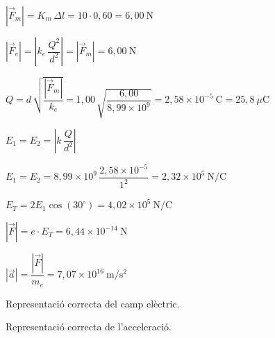 \begin{solapartat}
 $|\vec{F}_m| = K_m\,\Delta l = 10\cdot 0,60 = 6,00\ \mathrm{N}$ \qquad {}

 $|\vec{F}_e| = \left|k_e\,\dfrac{Q^2}{d^2}\right| = |\vec{F}_m| = 6,00\ \mathrm{N}$ \quad {}

 $Q = d\,\sqrt{\dfrac{|\vec{F}_m|}{k_e}} = 1,00\,\sqrt{\dfrac{6,00}{8,99\times 10^{9}}} = 2,58\times 10^{-5}\ \mathrm{C} = 25,8\ \mu\mathrm{C}$ \qquad {}
\end{solapartat}

\begin{solapartat}

 $E_1 = E_2 = \left|k\,\dfrac{Q}{d^2}\right|$

 $E_1 = E_2 = 8,99\times 10^{9}\,\dfrac{2,58\times 10^{-5}}{1^2} = 2,32\times 10^{5}\ \mathrm{N/C}$

 $E_T = 2E_1\cos(30^\circ) = 4,02\times 10^{5}\ \mathrm{N/C}$

 $|\vec{F}| = e\cdot E_T = 6,44\times 10^{-14}\ \mathrm{N}$

 $|\vec{a}| = \dfrac{|\vec{F}|}{m_e} = 7,07\times 10^{16}\ \mathrm{m/s^2}$

 Representació correcta del camp elèctric.

 Representació correcta de l'acceleració.
\end{solapartat}
